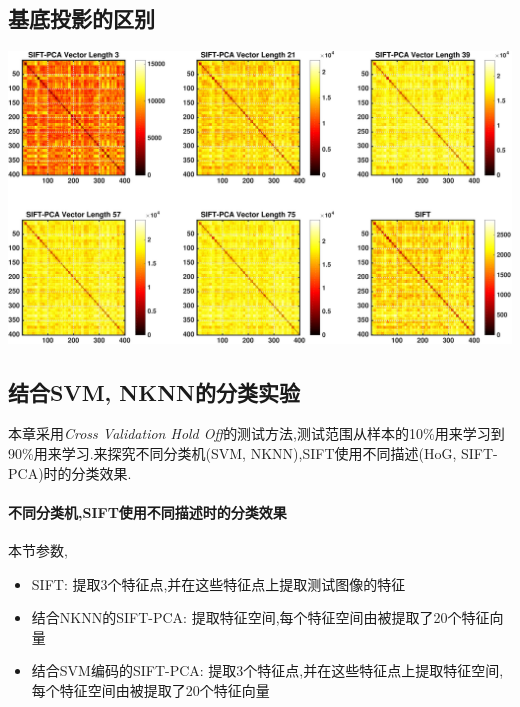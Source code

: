 \subsection{基底投影的区别}

			\begin{center}
		\begin{minipage}[t]{\linewidth}
		\center
		{
		\includegraphics[width=1.1\textwidth]{Img/c3/sift_dis_mat} 
		}
		\end{minipage}
		\medskip
		\end{center}
	

\subsection{结合SVM, NKNN的分类实验}
本章采用\textit{Cross Validation Hold Off}的测试方法,测试范围从样本的10\%用来学习到90\%用来学习.来探究不同分类机(SVM, NKNN),SIFT使用不同描述(HoG, SIFT-PCA)时的分类效果.\newline

\paragraph{不同分类机,SIFT使用不同描述时的分类效果}
本节参数,\begin{itemize}
	\item SIFT: 提取3个特征点,并在这些特征点上提取测试图像的特征
	\item 结合NKNN的SIFT-PCA: 提取特征空间,每个特征空间由被提取了20个特征向量
	\item 结合SVM编码的SIFT-PCA: 提取3个特征点,并在这些特征点上提取特征空间,每个特征空间由被提取了20个特征向量
\end{itemize}


